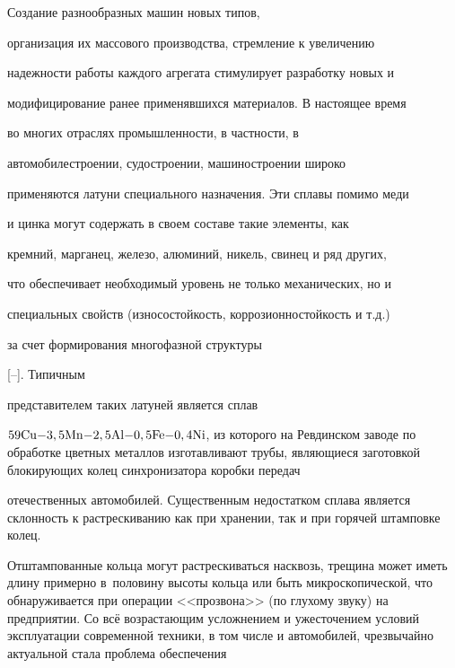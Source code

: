 


\date{30/VI/2012}




\maketitle





 Создание разнообразных машин новых типов,

организация их массового производства, стремление к увеличению

надежности работы каждого агрегата стимулирует разработку новых и

модифицирование ранее применявшихся материалов. В настоящее время

во многих отраслях промышленности, в частности, в

автомобилестроении, судостроении, машиностроении широко

применяются латуни специального назначения. Эти сплавы помимо меди

и цинка могут содержать в своем составе такие элементы, как

кремний, марганец, железо, алюминий, никель, свинец и ряд других,

что обеспечивает необходимый уровень не только механических, но и

специальных свойств (износостойкость, коррозионностойкость и т.д.)

за счет формирования многофазной структуры

[--]. Типичным

представителем таких латуней является сплав

$\rm 59Cu{-}3,5Mn{-}2,5Al{-}0,5Fe{-}0,4Ni$, из которого на Ревдинском заводе по обработке цветных металлов изготавливают трубы, являющиеся заготовкой блокирующих колец синхронизатора коробки передач

отечественных автомобилей. Существенным недостатком сплава является склонность к растрескиванию как при хранении, так и при горячей штамповке колец. 

Отштампованные кольца могут растрескиваться насквозь, трещина может иметь длину примерно в~половину высоты кольца или быть микроскопической, что обнаруживается при операции <<прозвона>> (по глухому звуку) на предприятии. Со всё возрастающим усложнением и ужесточением условий эксплуатации современной техники, в том числе и автомобилей, чрезвычайно актуальной стала проблема обеспечения

